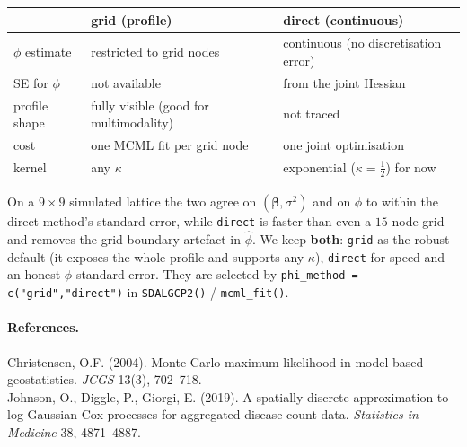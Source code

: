 \documentclass[11pt]{article}
\newcommand{\bet}{\bm{\beta}}
\begin{document}
\begin{center}
\begin{tabular}{@{}lll@{}}
\toprule
 & \textbf{grid (profile)} & \textbf{direct (continuous)}\\
\midrule
$\phi$ estimate & restricted to grid nodes & continuous (no discretisation error)\\
SE for $\phi$ & not available & from the joint Hessian\\
profile shape & fully visible (good for multimodality) & not traced\\
cost & one MCML fit per grid node & one joint optimisation\\
kernel & any $\kappa$ & exponential ($\kappa=\tfrac12$) for now\\
\bottomrule
\end{tabular}
\end{center}

On a $9\times9$ simulated lattice the two agree on $(\bet,\sigma^2)$ and on $\phi$
to within the direct method's standard error, while \texttt{direct} is faster than
even a $15$-node grid and removes the grid-boundary artefact in $\widehat\phi$. We
keep \textbf{both}: \texttt{grid} as the robust default (it exposes the whole
profile and supports any $\kappa$), \texttt{direct} for speed and an honest
$\phi$ standard error. They are selected by
\texttt{phi\_method = c("grid","direct")} in \texttt{SDALGCP2()} / \texttt{mcml\_fit()}.

\paragraph{References.}
Christensen, O.F. (2004). Monte Carlo maximum likelihood in model-based
geostatistics. \emph{JCGS} 13(3), 702--718.\\
Johnson, O., Diggle, P., Giorgi, E. (2019). A spatially discrete approximation to
log-Gaussian Cox processes for aggregated disease count data. \emph{Statistics in
Medicine} 38, 4871--4887.
\end{document}

